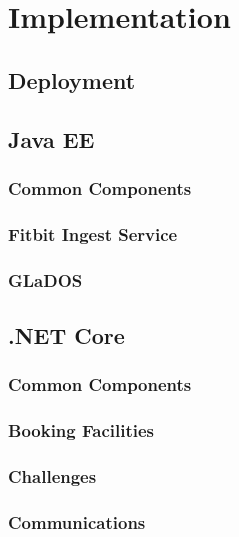 \chapter{Implementation}

\section{Deployment}
    

\section{Java EE}
    \subsection{Common Components}
    	

    \subsection{Fitbit Ingest Service}
        

    \subsection{GLaDOS}
    	

\section{.NET Core}
    \subsection{Common Components}
    	
    \subsection{Booking Facilities}
    	
    \subsection{Challenges}
    	
    \subsection{Communications}
    	
